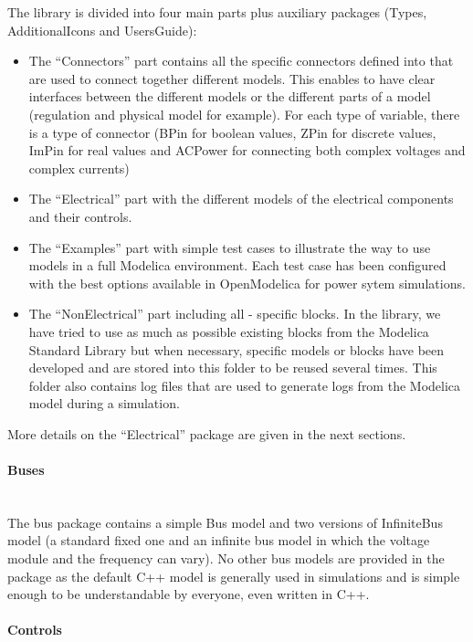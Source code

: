 \documentclass[a4paper, 12pt]{report}
\begin{document}
The \Dynawo library is divided into four main parts plus auxiliary packages (Types, AdditionalIcons and UsersGuide):
\begin{itemize}
\item The ``Connectors'' part contains all the specific connectors defined into \Dynawo that are used to connect together different models. This enables to have clear interfaces between the different models or the different parts of a model (regulation and physical model for example). For each type of variable, there is a type of connector (BPin for boolean values, ZPin for discrete values, ImPin for real values and ACPower for connecting both complex voltages and complex currents)
\item The ``Electrical'' part with the different models of the electrical components and their controls.
\item The ``Examples'' part with simple test cases to illustrate the way to use \Dynawo models in a full Modelica environment. Each test case has been configured with the best options available in OpenModelica for power sytem simulations.
\item The ``NonElectrical'' part including all \Dynawo - specific blocks. In the library, we have tried to use as much as possible existing blocks from the Modelica Standard Library but when necessary, specific models or blocks have been developed and are stored into this folder to be reused several times. This folder also contains log files that are used to generate logs from the Modelica model during a simulation.
\end{itemize}

More details on the ``Electrical'' package are given in the next sections.

\paragraph{Buses}
~~\\

The bus package contains a simple Bus model and two versions of InfiniteBus model (a standard fixed one and an infinite bus model in which the voltage module and the frequency can vary). No other bus models are provided in the package as the default C++ model is generally used in \Dynawo simulations and is simple enough to be understandable by everyone, even written in C++.

\paragraph{Controls}
~~\\
\end{document}

